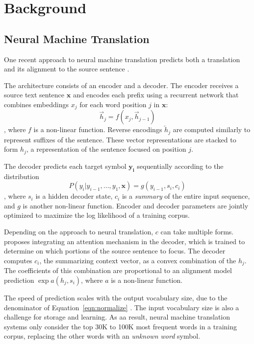 \section{Background}
\label{sec:background}

\subsection{Neural Machine Translation}
One recent approach to neural machine translation predicts both a translation
and its alignment to the source sentence .

The architecture consists of an encoder and a decoder. The encoder receives a
source text sentence $\mathbf{x}$ and encodes each prefix using a recurrent
network that combines embeddings $x_j$ for each word position $j$ in
$\mathbf{x}$:
\begin{equation}
\overrightarrow{h}_{j} = f(x_{j}, \overrightarrow{h}_{j-1})
\end{equation},
where $f$ is a non-linear function. Reverse encodings $\overleftarrow{h}_j$
are computed similarly to represent suffixes of the sentence. These vector
representations are stacked to form $h_j$, a representation of the sentence
focused on position $j$.

The decoder predicts each target symbol $\mathbf{y_i}$ sequentially according
to the distribution
\begin{equation}
P(y_{i} | y_{i-1}, ..., y_{1}, \mathbf{x}) = g(y_{i-1}, s_i, c_i)
\label{eqn:normalize}
\end{equation},
where $s_i$ is a hidden decoder state, $c_i$ is a \emph{summary} of the entire
input sequence, and $g$ is another non-linear function. Encoder and decoder
parameters are jointly optimized to maximize the log likelihood of a training
corpus.

Depending on the approach to neural translation, $c$ can take multiple forms.
 proposes integrating an attention mechanism
in the decoder, which is trained to determine on which portions of the source
sentence to focus. The decoder computes $c_{i}$, the summarizing context
vector, as a convex combination of the $h_{j}$. The coefficients of this
combination are proportional to an alignment model prediction $\exp a(h_j,
s_i)$, where $a$ is a non-linear function.

The speed of prediction scales with the output vocabulary size, due to the
denominator of Equation~\ref{eqn:normalize} \cite{journals/corr/JeanCMB14}. The
input vocabulary size is also a challenge for storage and learning. As aa
result, neural machine translation systems only consider the top 30K to 100K
most frequent words in a training corpus, replacing the other words with an
\emph{unknown word} symbol.

